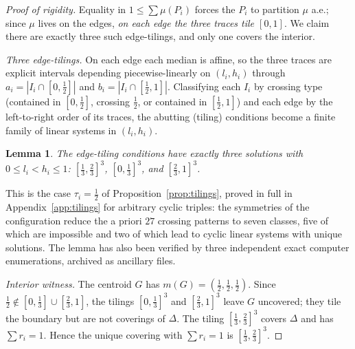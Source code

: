 \documentclass[11pt,reqno]{amsart}
\theoremstyle{plain}
\newtheorem{lemma}[theorem]{Lemma}
\theoremstyle{definition}
\theoremstyle{remark}
\begin{document}
\begin{proof}[Proof of rigidity]
Equality in $1\le\sum\mu(P_i)$ forces the $P_i$ to
partition $\mu$ a.e.; since $\mu$ lives on the edges, \emph{on each edge the three
traces tile $[0,1]$}. We claim there are exactly three such edge-tilings, and only
one covers the interior.

\emph{Three edge-tilings.} On each edge each median is affine, so the three traces
are explicit intervals depending piecewise-linearly on $(l_i,h_i)$ through
$a_i=|I_i\cap[0,\tfrac12]|$ and $b_i=|I_i\cap[\tfrac12,1]|$. Classifying each $I_i$ by
crossing type (contained in $[0,\tfrac12]$, crossing $\tfrac12$, or contained in
$[\tfrac12,1]$) and each edge by the left-to-right order of its traces, the abutting
(tiling) conditions become a finite family of linear systems in $(l_i,h_i)$.

\begin{lemma}\label{lem:three}
The edge-tiling conditions have exactly three solutions with $0\le l_i<h_i\le1$:
$[\tfrac13,\tfrac23]^3$, $[0,\tfrac13]^3$, and $[\tfrac23,1]^3$.
\end{lemma}
This is the case $\tau_i=\tfrac12$ of Proposition~\ref{prop:tilings}, proved in
full in Appendix~\ref{app:tilings} for arbitrary cyclic triples: the symmetries
of the configuration reduce the a priori $27$ crossing patterns to seven
classes, five of which are impossible and two of which lead to cyclic linear
systems with unique solutions. The lemma has also been verified by three
independent exact computer enumerations, archived as ancillary files.

\emph{Interior witness.} The centroid $G$ has $m(G)=(\tfrac12,\tfrac12,\tfrac12)$.
Since $\tfrac12\notin[0,\tfrac13]\cup[\tfrac23,1]$, the tilings $[0,\tfrac13]^3$ and
$[\tfrac23,1]^3$ leave $G$ uncovered; they tile the boundary but are not coverings
of $\Delta$. The tiling $[\tfrac13,\tfrac23]^3$ covers $\Delta$ and has
$\sum r_i=1$. Hence the unique covering with $\sum r_i=1$ is $[\tfrac13,\tfrac23]^3$.
\end{proof}
\end{document}
